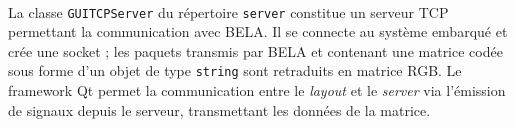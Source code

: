 \paragraph{}
La classe \verb!GUITCPServer! du répertoire \verb!server! constitue un
serveur TCP permettant la communication avec BELA. Il se connecte au
système embarqué et crée une socket ; les paquets transmis par BELA et
contenant une matrice codée sous forme d'un objet de type
\verb!string! sont retraduits en matrice RGB. Le framework Qt permet
la communication entre le \textit{layout} et le \textit{server} via
l'émission de signaux depuis le serveur, transmettant les données de
la matrice.
